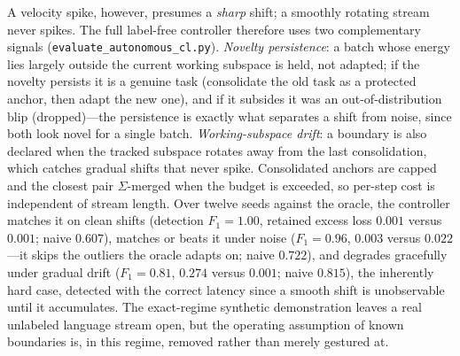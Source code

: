 \documentclass[10pt,a4paper]{article}
\theoremstyle{plain}
\theoremstyle{definition}
\newcommand{\Sig}{\Sigma}
\begin{document}
A velocity spike, however, presumes a \emph{sharp} shift; a smoothly rotating stream
never spikes. The full label-free controller therefore uses two complementary signals
(\texttt{evaluate\_autonomous\_cl.py}). \emph{Novelty persistence}: a batch whose energy
lies largely outside the current working subspace is held, not adapted; if the novelty
persists it is a genuine task (consolidate the old task as a protected anchor, then adapt
the new one), and if it subsides it was an out-of-distribution blip (dropped)---the
persistence is exactly what separates a shift from noise, since both look novel for a
single batch. \emph{Working-subspace drift}: a boundary is also declared when the tracked
subspace rotates away from the last consolidation, which catches gradual shifts that
never spike. Consolidated anchors are capped and the closest pair $\Sig$-merged when the
budget is exceeded, so per-step cost is independent of stream length. Over twelve seeds
against the oracle, the controller matches it on clean shifts (detection $F_1=1.00$,
retained excess loss $0.001$ versus $0.001$; naive $0.607$), matches or beats it under
noise ($F_1=0.96$, $0.003$ versus $0.022$---it skips the outliers the oracle adapts on;
naive $0.722$), and degrades gracefully under gradual drift ($F_1=0.81$, $0.274$ versus
$0.001$; naive $0.815$), the inherently hard case, detected with the correct latency
since a smooth shift is unobservable until it accumulates. The exact-regime synthetic
demonstration leaves a real unlabeled language stream open, but the operating assumption
of known boundaries is, in this regime, removed rather than merely gestured at.
\end{document}
